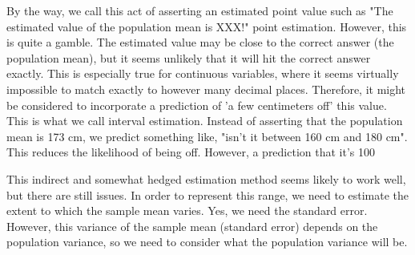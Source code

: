 \documentclass{ltjsbook}
\begin{document}
By the way, we call this act of asserting an estimated point value such as "The estimated value of the population mean is XXX!" point estimation. However, this is quite a gamble. The estimated value may be close to the correct answer (the population mean), but it seems unlikely that it will hit the correct answer exactly. This is especially true for continuous variables, where it seems virtually impossible to match exactly to however many decimal places. Therefore, it might be considered to incorporate a prediction of 'a few centimeters off' this value. This is what we call interval estimation. Instead of asserting that the population mean is 173 cm, we predict something like, "isn't it between 160 cm and 180 cm". This reduces the likelihood of being off. However, a prediction that it's 100%

This indirect and somewhat hedged estimation method seems likely to work well, but there are still issues. In order to represent this range, we need to estimate the extent to which the sample mean varies. Yes, we need the standard error. However, this variance of the sample mean (standard error) depends on the population variance, so we need to consider what the population variance will be.
\end{document}
